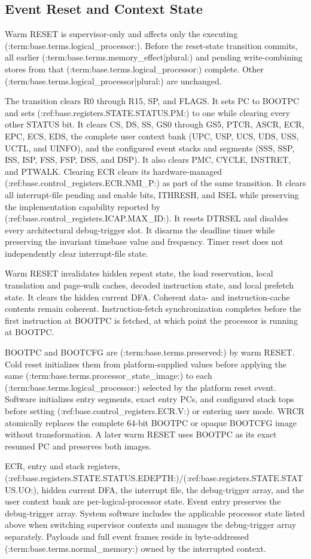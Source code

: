\subsection{Event Reset and Context State}\label{section:event-reset-and-context-state}
Warm RESET is supervisor-only and affects only the executing (:term:base.terms.logical_processor:). Before the reset-state
transition commits, all earlier (:term:base.terms.memory_effect|plural:) and pending write-combining stores from that
(:term:base.terms.logical_processor:) complete. Other (:term:base.terms.logical_processor|plural:) are unchanged.

The transition clears R0 through R15, SP, and FLAGS. It sets PC to BOOTPC and sets (:ref:base.registers.STATE.STATUS.PM:) to one while clearing
every other STATUS bit. It clears CS, DS, SS, GS0 through GS5, PTCR, ASCR, ECR, EPC, ECS, EDS, the complete user
context bank (UPC, USP, UCS, UDS, USS, UCTL, and UINFO), and the configured event stacks and segments (SSS, SSP,
ISS, ISP, FSS, FSP, DSS, and DSP). It also clears PMC, CYCLE, INSTRET, and PTWALK. Clearing ECR clears its
hardware-managed (:ref:base.control_registers.ECR.NMI_P:) as part of the same transition.
It clears all interrupt-file pending and enable bits, ITHRESH, and ISEL while preserving the implementation capability
reported by (:ref:base.control_registers.ICAP.MAX_ID:).
It resets DTRSEL and disables every architectural debug-trigger slot.
It disarms the deadline timer while preserving the invariant timebase value and frequency. Timer reset does not
independently clear interrupt-file state.

Warm RESET invalidates hidden repeat state, the load reservation, local translation and page-walk caches, decoded
instruction state, and local prefetch state. It clears the hidden current DFA. Coherent data- and instruction-cache
contents remain coherent. Instruction-fetch synchronization completes before the first instruction at BOOTPC is
fetched, at which point the processor is running at BOOTPC.

BOOTPC and BOOTCFG are (:term:base.terms.preserved:) by warm RESET. Cold reset initializes them from platform-supplied
values before applying the same (:term:base.terms.processor_state_image:) to each (:term:base.terms.logical_processor:)
selected by the platform reset event. Software initializes entry segments, exact entry PCs, and configured stack tops
before setting (:ref:base.control_registers.ECR.V:) or entering user mode.
WRCR atomically replaces the complete 64-bit BOOTPC or opaque BOOTCFG image without transformation. A later warm RESET uses
BOOTPC as its exact resumed PC and preserves both images.

ECR, entry and stack registers, (:ref:base.registers.STATE.STATUS.EDEPTH:)/(:ref:base.registers.STATE.STATUS.UO:), hidden current DFA, the interrupt file, the debug-trigger array, and
the user context bank are per-logical-processor state. Event entry preserves the debug-trigger array. System software
includes the applicable processor state listed above when switching supervisor contexts and manages the debug-trigger
array separately.
Payloads and full event frames reside in byte-addressed (:term:base.terms.normal_memory:) owned by the interrupted context.
